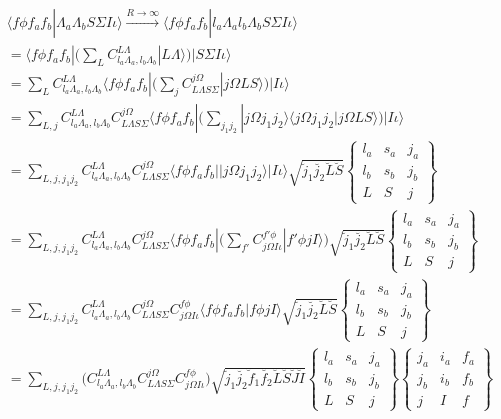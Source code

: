 \documentclass[prl, longbibliography]{revtex4-2}
\begin{document}
\begin{equation}
\begin{split}
\langle f \phi f_a f_b |\Lambda_a \Lambda_b S\Sigma I\iota\rangle
\xrightarrow{R\rightarrow\infty}
\langle f \phi f_a f_b |l_a\Lambda_a l_b\Lambda_b S\Sigma I\iota\rangle\\
= \langle f \phi f_a f_b | \Bigg(\sum_{L} C^{L\Lambda}_{l_a \Lambda_a, l_b \Lambda_b} |L \Lambda\rangle\Bigg) | S\Sigma I\iota\rangle\\
= \sum_{L} C^{L\Lambda}_{l_a \Lambda_a, l_b \Lambda_b} \langle f \phi f_a f_b | \Big(\sum_{j}C_{L\Lambda S\Sigma}^{j\Omega} |j\Omega L S\rangle\Big) | I\iota\rangle\\
= \sum_{L, j} C^{L\Lambda}_{l_a \Lambda_a, l_b \Lambda_b} C_{L\Lambda S\Sigma}^{j\Omega} \langle f \phi f_a f_b | \Bigg(\sum_{j_1 j_2} |j\Omega j_1 j_2 \rangle\langle j\Omega j_1 j_2 |j\Omega L S\rangle\Bigg) | I\iota\rangle\\
= \sum_{L, j, j_1 j_2} 
C^{L\Lambda}_{l_a \Lambda_a, l_b \Lambda_b} 
C_{L\Lambda S\Sigma}^{j\Omega} 
\langle f \phi f_a f_b | |j\Omega j_1 j_2 \rangle | I\iota\rangle
\sqrt{\breve{j}_1\breve{j_2}\breve{L}\breve{S}}
\begin{Bmatrix}
l_a & s_a & j_a\\
l_b & s_b & j_b\\
L & S & j
\end{Bmatrix}\\
= \sum_{L, j, j_1 j_2} 
C^{L\Lambda}_{l_a \Lambda_a, l_b \Lambda_b} 
C_{L\Lambda S\Sigma}^{j\Omega} 
\langle f \phi f_a f_b | \Bigg(\sum_{f'} C_{j\Omega I \iota}^{f' \phi} |f' \phi j I\rangle\Bigg)
\sqrt{\breve{j}_1\breve{j_2}\breve{L}\breve{S}}
\begin{Bmatrix}
l_a & s_a & j_a\\
l_b & s_b & j_b\\
L & S & j
\end{Bmatrix}\\
= \sum_{L, j, j_1 j_2} 
C^{L\Lambda}_{l_a \Lambda_a, l_b \Lambda_b} 
C_{L\Lambda S\Sigma}^{j\Omega} 
 C_{j\Omega I \iota}^{f \phi}
\langle f \phi f_a f_b |f \phi j I\rangle
\sqrt{\breve{j}_1\breve{j_2}\breve{L}\breve{S}}
\begin{Bmatrix}
l_a & s_a & j_a\\
l_b & s_b & j_b\\
L & S & j
\end{Bmatrix}\\
= \sum_{L, j, j_1 j_2} 
\bigg(
C^{L\Lambda}_{l_a \Lambda_a, l_b \Lambda_b} 
C_{L\Lambda S\Sigma}^{j\Omega} 
C_{j\Omega I \iota}^{f \phi}
\bigg)
\sqrt{\breve{j}_1\breve{j_2}\breve{f}_1\breve{f_2}
\breve{L}\breve{S}\breve{J}\breve{I}}
\begin{Bmatrix}
l_a & s_a & j_a\\
l_b & s_b & j_b\\
L & S & j
\end{Bmatrix}
\begin{Bmatrix}
j_a & i_a & f_a\\
j_b & i_b & f_b\\
j & I & f
\end{Bmatrix}
\end{split}
\end{equation}
\end{document}
